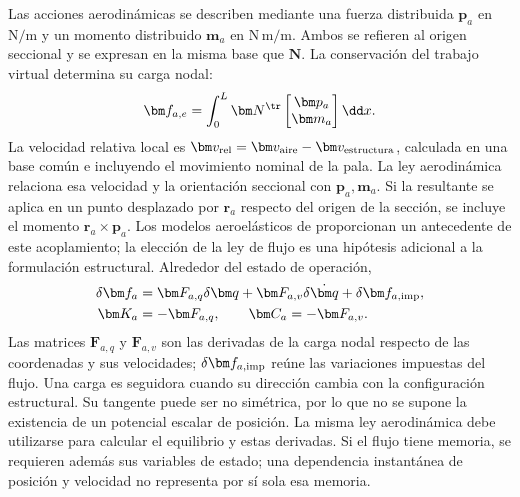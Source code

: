 Las acciones aerodinámicas se describen mediante una fuerza distribuida $\bm p_a$ en $\mathrm{N/m}$ y un momento distribuido $\bm m_a$ en $\mathrm{N\,m/m}$. Ambos se refieren al origen seccional y se expresan en la misma base que $\bm N$. La conservación del trabajo virtual determina su carga nodal:
\begin{equation}
\bm f_{a,e}=\int_0^L\bm N^\tr
\begin{bmatrix}\bm p_a\\\bm m_a\end{bmatrix}\dd x.
\end{equation}
La velocidad relativa local es $\bm v_{\rm rel}=\bm v_{\rm aire}-\bm v_{\rm estructura}$, calculada en una base común e incluyendo el movimiento nominal de la pala. La ley aerodinámica relaciona esa velocidad y la orientación seccional con $\bm p_a,\bm m_a$. Si la resultante se aplica en un punto desplazado por $\bm r_a$ respecto del origen de la sección, se incluye el momento $\bm r_a\times\bm p_a$. Los modelos aeroelásticos de \citet{maza2014} proporcionan un antecedente de este acoplamiento; la elección de la ley de flujo es una hipótesis adicional a la formulación estructural. Alrededor del estado de operación,
\begin{align}
\delta\bm f_a&=\bm F_{a,q}\delta\bm q+\bm F_{a,v}\delta\dot{\bm q}
+\delta\bm f_{a,\rm imp},\nonumber\\
\bm K_a&=-\bm F_{a,q},\qquad \bm C_a=-\bm F_{a,v}.
\end{align}
Las matrices $\bm F_{a,q}$ y $\bm F_{a,v}$ son las derivadas de la carga nodal respecto de las coordenadas y sus velocidades; $\delta\bm f_{a,\rm imp}$ reúne las variaciones impuestas del flujo. Una carga es seguidora cuando su dirección cambia con la configuración estructural. Su tangente puede ser no simétrica, por lo que no se supone la existencia de un potencial escalar de posición. La misma ley aerodinámica debe utilizarse para calcular el equilibrio y estas derivadas. Si el flujo tiene memoria, se requieren además sus variables de estado; una dependencia instantánea de posición y velocidad no representa por sí sola esa memoria.

